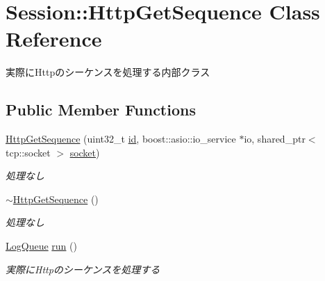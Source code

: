 \hypertarget{class_session_1_1_http_get_sequence}{}\section{Session\+::Http\+Get\+Sequence Class Reference}
\label{class_session_1_1_http_get_sequence}


実際に\+Httpのシーケンスを処理する内部クラス  


\subsection*{Public Member Functions}
\begin{DoxyCompactItemize}
\item 
\mbox{\label{class_session_1_1_http_get_sequence_af6396426c0d4e6a8eb8de9744c94c182}} 
\mbox{\hyperlink{class_session_1_1_http_get_sequence_af6396426c0d4e6a8eb8de9744c94c182}{Http\+Get\+Sequence}} (uint32\+\_\+t \mbox{\hyperlink{class_session_1_1_http_get_sequence_a3b3a0b3b9aee4a74cef8eccdcf5bffb0}{id}}, boost\+::asio\+::io\+\_\+service $\ast$io, shared\+\_\+ptr$<$ tcp\+::socket $>$ \mbox{\hyperlink{class_session_1_1_http_get_sequence_a306d423aa5fea9785ae8e7f31db0eb73}{socket}})
\begin{DoxyCompactList}\small\item\em 処理なし \end{DoxyCompactList}\item 
\mbox{\label{class_session_1_1_http_get_sequence_aae42e22aa43fdf4b3e468d5b65319020}} 
\mbox{\hyperlink{class_session_1_1_http_get_sequence_aae42e22aa43fdf4b3e468d5b65319020}{$\sim$\+Http\+Get\+Sequence}} ()
\begin{DoxyCompactList}\small\item\em 処理なし \end{DoxyCompactList}\item 
\mbox{\hyperlink{class_log_queue}{Log\+Queue}} \mbox{\hyperlink{class_session_1_1_http_get_sequence_a1a90982bc3eaf7332de708f9e7a5e260}{run}} ()
\begin{DoxyCompactList}\small\item\em 実際に\+Httpのシーケンスを処理する \end{DoxyCompactList}\item 
\mbox{\label{class_session_1_1_http_get_sequence_a965ad56f58d8f766ee0dc190ddda2dd5}} 

\end{DoxyCompactItemize}
